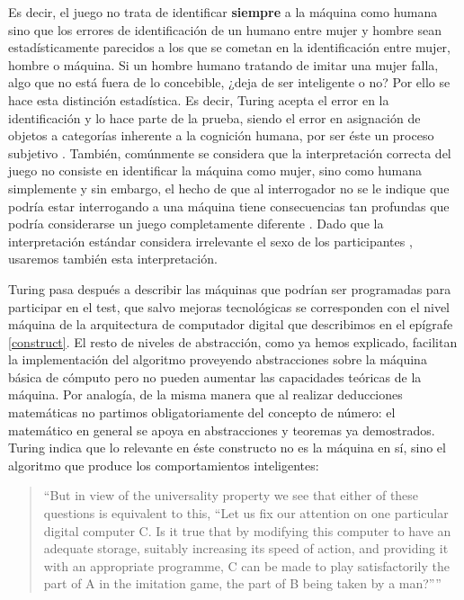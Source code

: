 \documentclass[12pt]{memoir}
\begin{document}
Es decir, el juego no trata de identificar \textbf{siempre} a la máquina como humana sino que los errores de identificación de un humano entre mujer y hombre sean estadísticamente parecidos a los que se cometan en la identificación entre mujer, hombre o máquina. Si un hombre humano tratando de imitar una mujer falla, algo que no está fuera de lo concebible, ¿deja de ser inteligente o no? Por ello se hace esta distinción estadística. Es decir, Turing acepta el error en la identificación y lo hace parte de la prueba, siendo el error en asignación de objetos a categorías inherente a la cognición humana, por ser éste un proceso subjetivo \parencite{lakoff}. También, comúnmente se considera que la interpretación correcta del juego no consiste en identificar la máquina como mujer, sino como humana simplemente y sin embargo, el hecho de que al interrogador no se le indique que podría estar interrogando a una máquina tiene consecuencias tan profundas que podría considerarse un juego completamente diferente \parencite[apartado 2]{turingHarmful}. Dado que la interpretación estándar considera irrelevante el sexo de los participantes \parencite[apartado 3.1]{sep-turing-test}, usaremos también esta interpretación.

Turing pasa después a describir las máquinas que podrían ser programadas para participar en el test, que salvo mejoras tecnológicas se corresponden con el nivel máquina de la arquitectura de computador digital que describimos en el epígrafe \ref{construct}. El resto de niveles de abstracción, como ya hemos explicado, facilitan la implementación del algoritmo proveyendo abstracciones sobre la máquina básica de cómputo pero no pueden aumentar las capacidades teóricas de la máquina. Por analogía, de la misma manera que al realizar deducciones matemáticas no partimos obligatoriamente del concepto de número: el matemático en general se apoya en abstracciones y teoremas ya demostrados. Turing indica que lo relevante en éste constructo no es la máquina en sí, sino el algoritmo que produce los comportamientos inteligentes: 

\begin{quotation}
``But in view of the universality property we see that either of these questions is equivalent to this, ``Let us fix our attention on one particular digital computer C. Is it true that by modifying this computer to have an adequate storage, suitably increasing its speed of action, and providing it with an appropriate programme, C can be made to play satisfactorily the part of A in the imitation game, the part of B being taken by a man?'''' \parencite[apartado 5]{Turing1950cmi}
\end{quotation}
\end{document}
